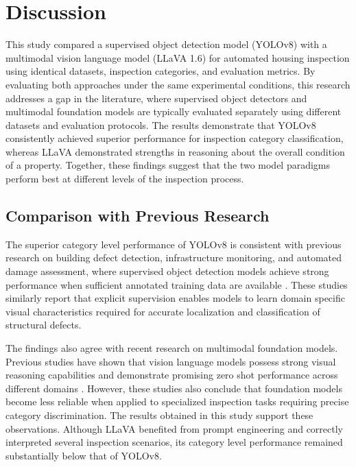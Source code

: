 \section{Discussion}
\label{sec:discussion}

This study compared a supervised object detection model (YOLOv8) with a multimodal vision language model (LLaVA 1.6) for automated housing inspection using identical datasets, inspection categories, and evaluation metrics. By evaluating both approaches under the same experimental conditions, this research addresses a gap in the literature, where supervised object detectors and multimodal foundation models are typically evaluated separately using different datasets and evaluation protocols. The results demonstrate that YOLOv8 consistently achieved superior performance for inspection category classification, whereas LLaVA demonstrated strengths in reasoning about the overall condition of a property. Together, these findings suggest that the two model paradigms perform best at different levels of the inspection process.

\subsection{Comparison with Previous Research}

The superior category level performance of YOLOv8 is consistent with previous research on building defect detection, infrastructure monitoring, and automated damage assessment, where supervised object detection models achieve strong performance when sufficient annotated training data are available \cite{kang_improvement_2025,lee_automated_2024}. These studies similarly report that explicit supervision enables models to learn domain specific visual characteristics required for accurate localization and classification of structural defects.

The findings also agree with recent research on multimodal foundation models. Previous studies have shown that vision language models possess strong visual reasoning capabilities and demonstrate promising zero shot performance across different domains \cite{jiang_mmad_2025,wen_autonomous_2024,malla_enhancing_2025}. However, these studies also conclude that foundation models become less reliable when applied to specialized inspection tasks requiring precise category discrimination. The results obtained in this study support these observations. Although LLaVA benefited from prompt engineering and correctly interpreted several inspection scenarios, its category level performance remained substantially below that of YOLOv8.

